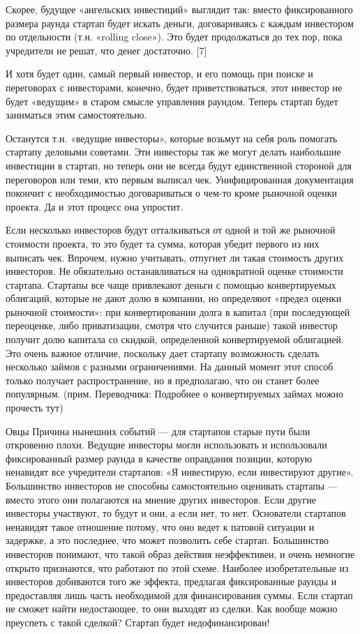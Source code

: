 \documentclass[ebook,12pt,oneside,openany]{memoir}
\begin{document}
Скорее, будущее «ангельских инвестиций» выглядит так: вместо
фиксированного размера раунда стартап будет искать деньги,
договариваясь с каждым инвестором по отдельности (т.н. «rolling
close»). Это будет продолжаться до тех пор, пока учредители не решат,
что денег достаточно. [7]

И хотя будет один, самый первый инвестор, и его помощь при поиске и
переговорах с инвесторами, конечно, будет приветствоваться, этот
инвестор не будет «ведущим» в старом смысле управления раундом. Теперь
стартап будет заниматься этим самостоятельно.

Останутся т.н. «ведущие инвесторы», которые возьмут на себя роль
помогать стартапу деловыми советами. Эти инвесторы так же могут делать
наибольшие инвестиции в стартап, но теперь они не всегда будут
единственной стороной для переговоров или теми, кто первым выписал
чек. Унифицированная документация покончит с необходимостью
договариваться о чем-то кроме рыночной оценки проекта. Да и этот
процесс она упростит.

Если несколько инвесторов будут отталкиваться от одной и той же
рыночной стоимости проекта, то это будет та сумма, которая убедит
первого из них выписать чек. Впрочем, нужно учитывать, отпугнет ли
такая стоимость других инвесторов. Не обязательно останавливаться на
однократной оценке стоимости стартапа. Стартапы все чаще привлекают
деньги с помощью конвертируемых облигаций, которые не дают долю в
компании, но определяют «предел оценки рыночной стоимости»: при
конвертировании долга в капитал (при последующей переоценке, либо
приватизации, смотря что случится раньше) такой инвестор получит долю
капитала со скидкой, определенной конвертируемой облигацией. Это очень
важное отличие, поскольку дает стартапу возможность сделать несколько
займов с разными ограничениями. На данный момент этот способ только
получает распространение, но я предполагаю, что он станет более
популярным. (прим. Переводчика: Подробнее о конвертируемых займах
можно прочесть тут)

Овцы Причина нынешних событий — для стартапов старые пути были
откровенно плохи. Ведущие инвесторы могли использовать и использовали
фиксированный размер раунда в качестве оправдания позиции, которую
ненавидят все учредители стартапов: «Я инвестирую, если инвестируют
другие». Большинство инвесторов не способны самостоятельно оценивать
стартапы — вместо этого они полагаются на мнение других инвесторов.
Если другие инвесторы участвуют, то будут и они, а если нет, то нет.
Основатели стартапов ненавидят такое отношение потому, что оно ведет к
патовой ситуации и задержке, а это последнее, что может позволить себе
стартап. Большинство инвесторов понимают, что такой образ действия
неэффективен, и очень немногие открыто признаются, что работают по
этой схеме. Наиболее изобретательные из инвесторов добиваются того же
эффекта, предлагая фиксированные раунды и предоставляя лишь часть
необходимой для финансирования суммы. Если стартап не сможет найти
недостающее, то они выходят из сделки. Как вообще можно преуспеть с
такой сделкой? Стартап будет недофинансирован!
\end{document}
